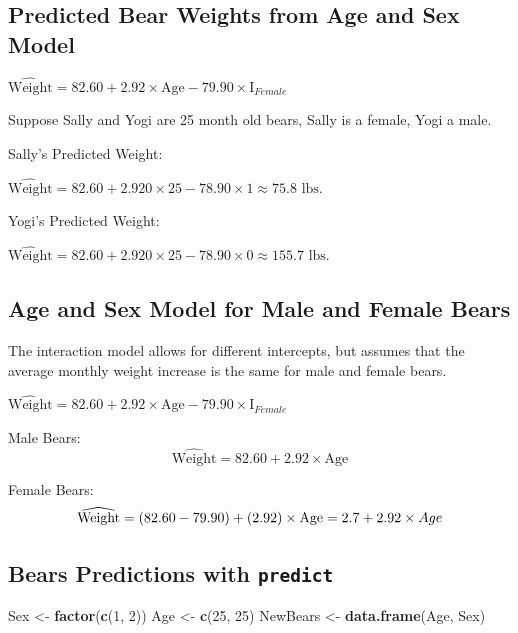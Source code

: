 \documentclass[]{book}
\newenvironment{Shaded}{\begin{snugshade}}{\end{snugshade}}
\newcommand{\KeywordTok}[1]{\textcolor[rgb]{0.13,0.29,0.53}{\textbf{#1}}}
\newcommand{\DecValTok}[1]{\textcolor[rgb]{0.00,0.00,0.81}{#1}}
\newcommand{\StringTok}[1]{\textcolor[rgb]{0.31,0.60,0.02}{#1}}
\newcommand{\NormalTok}[1]{#1}
\begin{document}
\subsection{Predicted Bear Weights from Age and Sex
Model}\label{predicted-bear-weights-from-age-and-sex-model}

\(\widehat{\text{Weight}}= 82.60 + 2.92 \times\text{Age} - 79.90\times\text{I}_{Female}\)

Suppose Sally and Yogi are 25 month old bears, Sally is a female, Yogi a
male.

Sally's Predicted Weight:

\(\widehat{\text{Weight}}= 82.60 + 2.920 \times 25 -78.90\times 1 \approx 75.8 \text{ lbs.}\)

Yogi's Predicted Weight:

\(\widehat{\text{Weight}}= 82.60 + 2.920 \times 25 -78.90\times 0 \approx 155.7 \text{ lbs.}\)

\subsection{Age and Sex Model for Male and Female
Bears}\label{age-and-sex-model-for-male-and-female-bears}

The interaction model allows for different intercepts, but assumes that
the average monthly weight increase is the same for male and female
bears.

\(\widehat{\text{Weight}}= 82.60 + 2.92 \times\text{Age} - 79.90\times\text{I}_{Female}\)

Male Bears: \[
\widehat{\text{Weight}}= 82.60 + 2.92 \times\text{Age}
\]

Female Bears: \[
\widehat{\text{Weight}}= (82.60 -79.90) + (2.92)\times\text{Age} \\
= 2.7+2.92\times Age
\]

\subsection{\texorpdfstring{Bears Predictions with
\texttt{predict}}{Bears Predictions with predict}}\label{bears-predictions-with-predict}

\begin{Shaded}
\begin{Highlighting}[]
\NormalTok{Sex <-}\StringTok{ }\KeywordTok{factor}\NormalTok{(}\KeywordTok{c}\NormalTok{(}\DecValTok{1}\NormalTok{, }\DecValTok{2}\NormalTok{))}
\NormalTok{Age <-}\StringTok{ }\KeywordTok{c}\NormalTok{(}\DecValTok{25}\NormalTok{, }\DecValTok{25}\NormalTok{)}
\NormalTok{NewBears <-}\StringTok{ }\KeywordTok{data.frame}\NormalTok{(Age, Sex)}
\end{Highlighting}
\end{Shaded}
\end{document}
